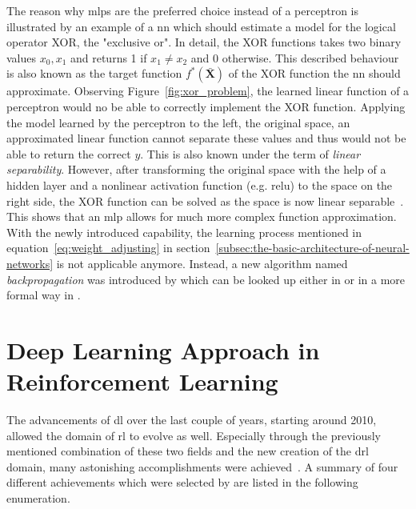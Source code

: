 \documentclass[draft,final]{vutinfth} %
\newcommand{\p}[1]{see p. #1}
\begin{document}
    \footnotetext{\cite[\p{168}]{goodfellow_deep_2016}}
    The reason why \glspl{mlp} are the preferred choice instead of a perceptron is illustrated by an example of a \gls{nn} which should estimate a model for the logical operator XOR, the "exclusive or".
    In detail, the XOR functions takes two binary values $x_0,x_1$ and returns 1 if $x_1 \neq x_2$ and 0 otherwise.
    This described behaviour is also known as the target function $f^*(\bar{\boldsymbol{X}})$ of the XOR function the \gls{nn} should approximate.
    Observing Figure~\ref{fig:xor_problem}, the learned linear function of a perceptron would no be able to correctly implement the XOR function.
    Applying the model learned by the perceptron to the left, the original space, an approximated linear function cannot separate these values and thus would not be able to return the correct $y$.
    This is also known under the term of \textit{linear separability}.
    However, after transforming the original space with the help of a hidden layer and a nonlinear activation function (e.g. \gls{relu}) to the space on the right side, the XOR function can be solved as the space is now linear separable~\citep[\p{166ff}; \p{32ff}]{goodfellow_deep_2016,aggarwal_neural_2018}.
    This shows that an \gls{mlp} allows for much more complex function approximation.
    With the newly introduced capability, the learning process mentioned in equation~\ref{eq:weight_adjusting} in section~\ref{subsec:the-basic-architecture-of-neural-networks} is not applicable anymore.
    Instead, a new algorithm named \textit{backpropagation} was introduced by \citeauthor{rumelhart_learning_1986} which can be looked up either in \citet[\p{21}]{aggarwal_neural_2018} or in a more formal way in \citet[\p{197}]{goodfellow_deep_2016}.




    \section{Deep Learning Approach in Reinforcement Learning}
    The advancements of \gls{dl} over the last couple of years, starting around 2010, allowed the domain of \gls{rl} to evolve as well.
    Especially through the previously mentioned combination of these two fields and the new creation of the \gls{drl} domain, many astonishing accomplishments were achieved~\citep{francois-lavet_introduction_2018}.
    A summary of four different achievements which were selected by \citet[\p{374}]{aggarwal_neural_2018} are listed in the following enumeration.
\end{document}

